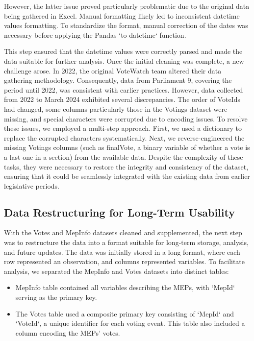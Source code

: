 \documentclass{article}
\begin{document}
    However, the latter issue proved particularly problematic due to the original data being gathered in Excel. Manual
    formatting likely led to inconsistent datetime values formatting. To standardize the format, manual correction of
    the dates was necessary before applying the Pandas `to datetime` function.

    This step ensured that the datetime values were correctly parsed and made the data suitable for further analysis.
    Once the initial cleaning was complete, a new challenge arose. In 2022, the original VoteWatch team altered their
    data gathering methodology. Consequently, data from Parliament 9, covering the period until 2022, was consistent
    with earlier practices. However, data collected from 2022 to March 2024 exhibited several discrepancies. The order
    of VoteIds had changed, some columns particularly those in the Votings dataset were missing, and special characters
    were corrupted due to encoding issues.
    To resolve these issues, we employed a multi-step approach. First, we used a dictionary to replace the corrupted
    characters systematically. Next, we reverse-engineered the missing Votings columns (such as finalVote, a binary
    variable of whether a vote is a last one in a section) from the available data. Despite the complexity of these
    tasks, they were necessary to restore the integrity and consistency of the dataset, ensuring that it could be
    seamlessly integrated with the existing data from earlier legislative periods.

    \subsection{Data Restructuring for Long-Term Usability}

    With the Votes and MepInfo datasets cleaned and supplemented, the next step was to restructure the data into a
    format suitable for long-term storage, analysis, and future updates. The data was initially stored in a long format,
    where each row represented an observation, and columns represented variables. To facilitate analysis, we separated
    the MepInfo and Votes datasets into distinct tables:
    \begin{itemize}
        \item MepInfo table contained all variables describing the MEPs, with `MepId` serving as the primary key.
        \item
        The Votes table used a composite primary key consisting of `MepId` and `VoteId`, a unique identifier for each
        voting event. This table also included a column encoding the MEPs' votes.
    \end{itemize}
\end{document}
